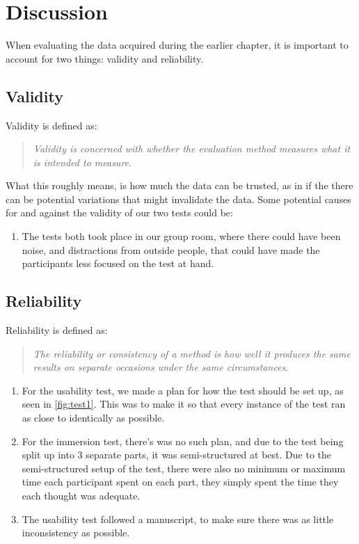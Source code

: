 \chapter{Discussion}
When evaluating the data acquired during the earlier chapter, it is important to account for two things: validity and reliability.
\section*{Validity}
	Validity is defined as:\\
	\begin{quote}
		\textit{Validity is concerned with whether the evaluation method measures what it is intended to measure}\cite{interactionDesign}.\\
	\end{quote}
	What this roughly means, is how much the data can be trusted, as in if the there can be potential variations that might invalidate the data. Some potential causes for and against the validity of our two tests could be:\\
	\begin{enumerate}
		\item The tests both took place in our group room, where there could have been noise, and distractions from outside people, that could have made the participants less focused on the test at hand.\\
		
	\end{enumerate}
\section*{Reliability}
	Reliability is defined as:\\
	\begin{quote}
		\textit{The reliability or consistency of a method is how well it produces the same results on separate occasions under the same circumstances}\cite{interactionDesign}.\\
	\end{quote}

	\begin{enumerate}
		\item For the usability test, we made a plan for how the test should be set up, as seen in \autoref{fig:test1}. This was to make it so that every instance of the test ran as close to identically as possible.\\
		
		\item For the immersion test, there's was no such plan, and due to the test being split up into 3 separate parts, it was semi-structured at best. Due to the semi-structured setup of the test, there were also no minimum or maximum time each participant spent on each part, they simply spent the time they each thought was adequate.\\
		
		\item The usability test followed a manuscript, to make sure there was as little inconsistency as possible.\\
	\end{enumerate}
	
